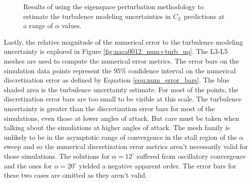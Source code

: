 \begin{figure}
\center
{}
\caption{Results of using the eigenspace perturbation methodology to estimate the turbulence modeling uncertainties in $C_L$ predictions at a range of $\alpha$ values. }\label{fig:naca0012_mesh_sweeps}
\end{figure}

Lastly, the relative magnitude of the numerical error to the turbulence modeling uncertainty is explored in Figure \ref{fig:naca0012_num+turb_uq}. 
The L3-L5 meshes are used to compute the numerical error metrics. 
The error bars on the simulation data points represent the $95\%$ confidence interval on the numerical discretization error as defined by Equation \ref{equ:num_error_bars}.
The blue shaded area is the turbulence uncertainty estimate. 
For most of the points, the discretization error bars are too small to be visible at this scale.
The turbulence uncertainty is greater than the discretization error bars for most of the simulations, even those at lower angles of attack. 
But care must be taken when talking about the simulations at higher angles of attack. 
The mesh family is unlikely to be in the asymptotic range of convergence in the stall region of the $\alpha$ sweep and so the numerical discretization error metrics aren't necessarily valid for those simulations. 
The solutions for $\alpha = 12^\circ$ suffered from oscillatory convergence and the ones for $\alpha = 20^\circ$ yielded a negative apparent order.
The error bars for these two cases are omitted as they aren't valid.

